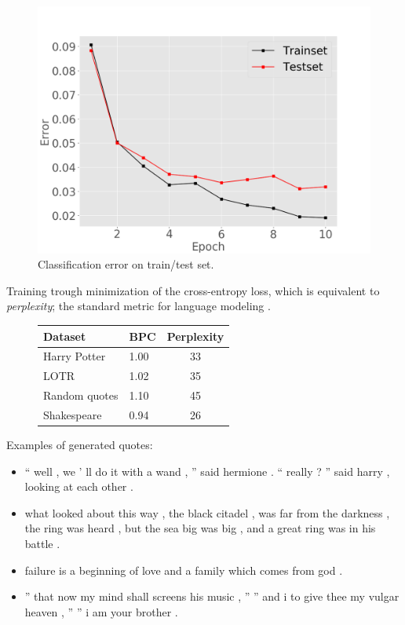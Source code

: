 
\begin{figure}[ht]
\vskip 0.2in
\begin{center}
\centerline{\includegraphics[width=\columnwidth]{classerror}}
\caption{Classification error on train/test set.}
\end{center}
\vskip -0.2in
\end{figure} 

Training trough minimization of the cross-entropy loss, which is equivalent to
\textit{perplexity}; the standard metric for language
modeling \cite{gravesGenerating}.
\begin{figure}[htbp!]
\begin{tabular}{|l|l|c|}
\hline
Dataset & BPC & Perplexity \\
\hline
Harry Potter & 1.00 & 33 \\
LOTR & 1.02 & 35 \\
Random quotes & 1.10 & 45 \\
Shakespeare & 0.94 & 26\\
\hline
\end{tabular}
\end{figure}

Examples of generated quotes:
\begin{itemize}\compresslist
    \item `` well , we ' ll do it with a wand , '' said hermione . `` really ?
      '' said harry , looking at each other .
    \item  what looked about this
      way , the black citadel , was far from the
          darkness , the ring was heard , but the sea big was big , and a great
          ring was in his battle .
    \item failure is a beginning of love and a family which comes from god .
    \item  '' that now my mind shall screens his music , '' '' and i to give
      thee my vulgar heaven , '' '' i am your brother .
\end{itemize}
